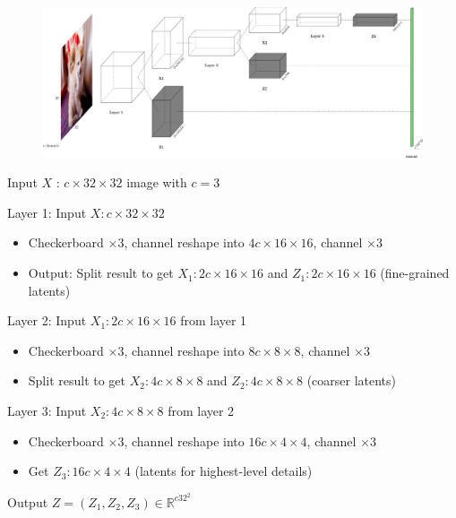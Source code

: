 \begin{definition}
    \begin{figure}[H]
        \centering
        \includegraphics[width=1.0\textwidth]{.././assets/10.16.png}
    \end{figure}

    Input $X$ : $c \times 32 \times 32$ image with $c=3$

    Layer 1: Input $X: c \times 32 \times 32$

    \begin{itemize}
        \item Checkerboard $\times 3$, channel reshape into $4 c \times 16 \times 16$, channel $\times 3$
        \item Output: Split result to get $X_{1}: 2 c \times 16 \times 16$ and $Z_{1}: 2 c \times 16 \times 16$ (fine-grained latents)
    \end{itemize}

    Layer 2: Input $X_{1}: 2 c \times 16 \times 16$ from layer 1

    \begin{itemize}
        \item Checkerboard $\times 3$, channel reshape into $8 c \times 8 \times 8$, channel $\times 3$
        \item Split result to get $X_{2}: 4 c \times 8 \times 8$ and $Z_{2}: 4 c \times 8 \times 8$ (coarser latents)
    \end{itemize}

    Layer 3: Input $X_{2}: 4 c \times 8 \times 8$ from layer 2

    \begin{itemize}
        \item Checkerboard $\times 3$, channel reshape into $16 c \times 4 \times 4$, channel $\times 3$
        \item Get $Z_{3}: 16 c \times 4 \times 4$ (latents for highest-level details)
    \end{itemize}

    Output $Z = (Z_1, Z_2, Z_3) \in \mathbb{R}^{c \dot 32^2}$
\end{definition}

